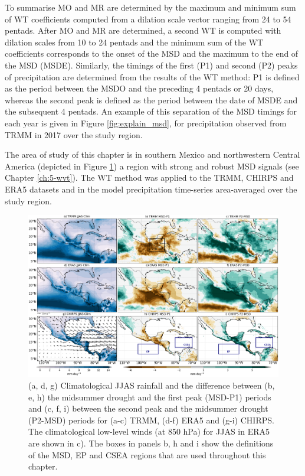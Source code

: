 To summarise MO and MR are determined by the maximum and minimum sum of WT coefficients computed from a dilation scale vector ranging from 24 to 54 pentads. After MO and MR are determined, a second WT is computed with dilation scales from 10 to 24 pentads and the minimum sum of the WT coefficients corresponds to the onset of the MSD and the maximum to the end of the MSD (MSDE). 
Similarly, the timings of the first (P1) and second (P2) peaks of precipitation are determined from the results of the WT method: P1 is defined as the period between the MSDO and the preceding 4 pentads or 20 days, whereas the second peak is defined as the period between the date of MSDE and the subsequent 4 pentads. An example of this separation of the MSD timings for each year is given in Figure \ref{fig:explain_msd}, for precipitation observed from TRMM in 2017 over the study region.

The area of study of this chapter is in southern Mexico and northwestern Central America (depicted in Figure \ref{fig:eof2}) a region with strong and robust MSD signals (see Chapter \ref{ch:5-wvt}). The WT method was applied to the TRMM, CHIRPS and ERA5 datasets and in the model precipitation time-series area-averaged over the study region. 

  \begin{figure}[b!]
\includegraphics[width=\linewidth]{figures/fig2obs_prdiff_2.png}
\caption[Observed composites of climatological and seasonal variations of precipitation.]{ (a, d, g) Climatological JJAS rainfall and the difference between  (b, e, h)  the midsummer drought and the first peak (MSD-P1) periods and (c, f, i)  between the second peak and the midsummer drought (P2-MSD) periods for (a-c) TRMM, (d-f) ERA5 and (g-i) CHIRPS. The climatological low-level winds (at 850 hPa) for JJAS in ERA5 are shown in c). The boxes in panels b, h and i show the definitions of the MSD, EP and CSEA regions that are used throughout this chapter.  }
\label{fig:eof2}
\end{figure} 

